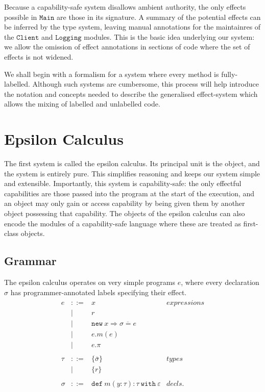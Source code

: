 \documentclass[a4paper,UKenglish]{lipics-v2016}
\newcommand{\kw}[1]{\mathtt{ #1 }~}
\newcommand{\kwa}[1]{\mathtt{ #1 }}
\begin{document}
Because a capability-safe system disallows ambient authority, the only effects possible in $\kwa{Main}$ are those in its signature. A summary of the potential effects can be inferred by the type system, leaving manual annotations for the maintainres of the $\kwa{Client}$ and $\kwa{Logging}$ modules. This is the basic idea underlying our system: we allow the omission of effect annotations in sections of code where the set of effects is not widened.

We shall begin with a formalism for a system where every method is fully-labelled. Although such systems are cumbersome, this process will help introduce the notation and concepts needed to describe the generalised effect-system which allows the mixing of labelled and unlabelled code.

\section{Epsilon Calculus}

The first system is called the epsilon calculus. Its principal unit is the object, and the system is entirely pure. This simplifies reasoning and keeps our system simple and extensible. Importantly, this system is capability-safe: the only effectful capabilities are those passed into the program at the start of the execution, and an object may only gain or access capability by being given them by another object possessing that capability. The objects of the epsilon calculus can also encode the modules of a capability-safe language where these are treated as first-class objects.

\subsection{Grammar}

The epsilon calculus operates on very simple programs $e$, where every declaration $\sigma$ has programmer-annotated labels specifying their effect.
\[
\begin{array}{lll}

\begin{array}{lllr}

e & ::= & x & expressions \\
  		& | & r \\
		& | & \kwa{new}~x \Rightarrow \overline{\sigma = e} \\
 		& | & e.m(e)\\
 		& | & e.\pi\\
		&&\\

\tau & ::= & \{ \bar \sigma \} & types \\
		& | & \{ r \} \\
		&&\\
		
\sigma & ::= & \kw{def} m(y:\tau):\tau~\kw{with}\varepsilon  & decls. \\
		&&\\

\end{array}
\end{array}
\]
\end{document}
